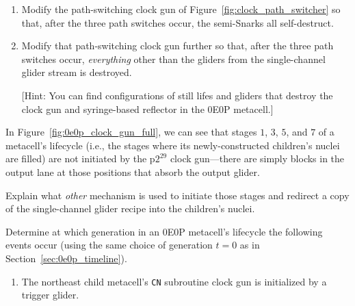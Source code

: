 \begin{multicols}{2}
\begin{problem}
		\begin{enumerate}[label=\bf\color{ocre}(\alph*)]
			\item {} Modify the path-switching clock gun of Figure~\ref{fig:clock_path_switcher} so that, after the three path switches occur, the semi-Snarks all self-destruct.
			
			\item {} Modify that path-switching clock gun further so that, after the three path switches occur, \emph{everything} other than the gliders from the single-channel glider stream is destroyed.
			
			[Hint: You can find configurations of still lifes and gliders that destroy the clock gun and syringe-based reflector in the 0E0P metacell.]
		\end{enumerate}
	\end{problem}


	\mfilbreak
	
	
	\begin{problem}\label{exer:0e0p_why_blocks_clock_lane} 
		In Figure~\ref{fig:0e0p_clock_gun_full}, we can see that stages $1$, $3$, $5$, and $7$ of a metacell's lifecycle (i.e., the stages where its newly-constructed children's nuclei are filled) are not initiated by the p$2^{29}$ clock gun---there are simply blocks in the output lane at those positions that absorb the output glider.
		
		\noindent Explain what \emph{other} mechanism is used to initiate those stages and redirect a copy of the single-channel glider recipe into the children's nuclei.
	\end{problem}


	\mfilbreak
	
	
	\begin{problem}\label{exer:0e0p_clock_gun_find_timestamps} 
		Determine at which generation in an 0E0P metacell's lifecycle the following events occur (using the same choice of generation $t = 0$ as in Section~\ref{sec:0e0p_timeline}).\smallskip
		
		\begin{enumerate}[label=\bf\color{ocre}(\alph*)]
			\item The northeast child metacell's \texttt{CN} subroutine clock gun is initialized by a trigger glider.
			

\end{enumerate}
\end{problem}
\end{multicols}
